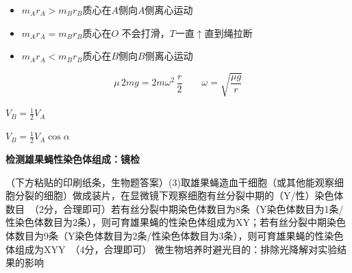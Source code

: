 \begin{itemize}
\item $m_Ar_A>m_Br_B$\quad 质心在$A$侧\quad 向$A$侧离心运动
\item $m_Ar_A=m_Br_B$\quad 质心在$O$ 不会打滑，$T$一直$\uparrow$直到绳拉断
\item $m_Ar_A<m_Br_B$\quad 质心在$B$侧\quad 向$B$侧离心运动
\end{itemize}
\[
\mu\,2mg=2m\omega^2\,\frac{r}{2}
\qquad
\omega=\sqrt{\frac{\mu g}{r}}
\]
\begin{minipage}[t]{0.40\linewidth}
$V_B=\frac12V_A$
\end{minipage}\hfill
\begin{minipage}[t]{0.55\linewidth}
$V_B=\frac12V_A\cos\alpha$
\end{minipage}

\quad {}
\textbf{检测雄果蝇性染色体组成：镜检}

（下方粘贴的印刷纸条，生物题答案）(3)取雄果蝇造血干细胞（或其他能观察细胞分裂的细胞）做成装片，在显微镜下观察细胞有丝分裂中期的（Y/性）染色体数目\ （2分，合理即可）若有丝分裂中期染色体数目为8条（Y染色体数目为1条/性染色体数目为2条），则可育雄果蝇的性染色体组成为XY；若有丝分裂中期染色体数目为9条（Y染色体数目为2条/性染色体数目为3条），则可育雄果蝇的性染色体组成为XYY\ （4分，合理即可）
微生物培养时避光目的：排除光降解对实验结果的影响

